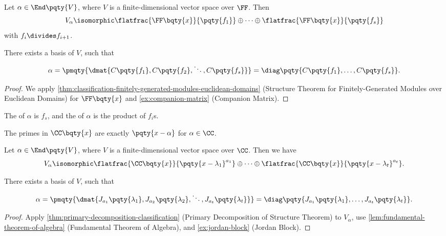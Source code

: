 \begin{theorem}
    \label{thm:rational-canonical-form}%
    Let \(\alpha \in \End\pqty{V}\), where \(V\) is a finite-dimensional vector space over \(\FF\). Then
    \[
        V_{\alpha} \isomorphic \flatfrac{\FF\bqty{x}}{\pqty{f_1}} \oplus \cdots \oplus \flatfrac{\FF\bqty{x}}{\pqty{f_s}}
    \]
    with \(f_i \divides f_{i + 1}\).

    There exists a basis of \(V\), such that
    \[
        \alpha = \pmqty{\dmat{C \pqty{f_1}, C \pqty{f_2}, \ddots, C \pqty{f_s}}} = \diag\pqty{C \pqty{f_1}, \ldots, C \pqty{f_s}}.
    \]
\end{theorem}

\begin{proof}
    We apply \autoref{thm:classification-finitely-generated-modules-euclidean-domains} (Structure Theorem for Finitely-Generated Modules over Euclidean Domains) for \(\FF\bqty{x}\) and \autoref{ex:companion-matrix} (Companion Matrix).
\end{proof}

\begin{remark}
    The  of \(\alpha\) is \(f_s\), and the  of \(\alpha\) is the product of \(f_i\)s.
\end{remark}

\begin{lemma}
    \label{lem:fundamental-theorem-of-algebra}%
    The primes in \(\CC\bqty{x}\) are exactly \(\pqty{x - \alpha}\) for \(\alpha \in \CC\).
\end{lemma}

\begin{theorem}
    \label{thm:jordan-canonical-form}%
    Let \(\alpha \in \End\pqty{V}\), where \(V\) is a finite-dimensional vector space over \(\CC\). Then we have
    \[
        V_{\alpha} \isomorphic \flatfrac{\CC\bqty{x}}{\pqty{x - \lambda_1}^{a_1}} \oplus \cdots \oplus \flatfrac{\CC\bqty{x}}{\pqty{x - \lambda_t}^{a_t}}.
    \]

    There exists a basis of \(V\), such that
    \[
        \alpha = \pmqty{\dmat{J_{a_1} \pqty{\lambda_1}, J_{a_2} \pqty{\lambda_2}, \ddots, J_{a_t} \pqty{\lambda_t}}}
        = \diag\pqty{J_{a_1} \pqty{\lambda_1}, \ldots, J_{a_t} \pqty{\lambda_t}}.
    \]
\end{theorem}

\begin{proof}
    Apply \autoref{thm:primary-decomposition-classification} (Primary Decomposition of Structure Theorem) to \(V_{\alpha}\), use \autoref{lem:fundamental-theorem-of-algebra} (Fundamental Theorem of Algebra), and \autoref{ex:jordan-block} (Jordan Block).
\end{proof}

